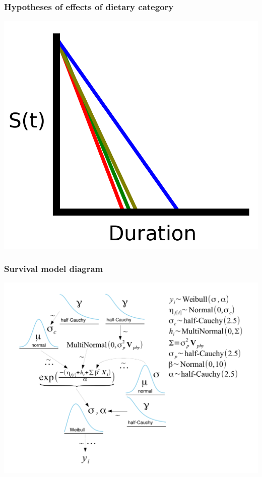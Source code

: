 \documentclass{beamer}
\begin{document}
\begin{frame}
  \frametitle{Hypotheses of effects of dietary category}
  \begin{center}
    \includegraphics[width = \textwidth,height = 0.8\textheight,keepaspectratio = true]{figure/diet_survival}
  \end{center}
\end{frame}

\begin{frame}
  \frametitle{Survival model diagram}
  \begin{center}
    \includegraphics[height=0.8\textheight,keepaspectratio=true]{figure/mammal_survival_model}
  \end{center}
\end{frame}
\end{document}
